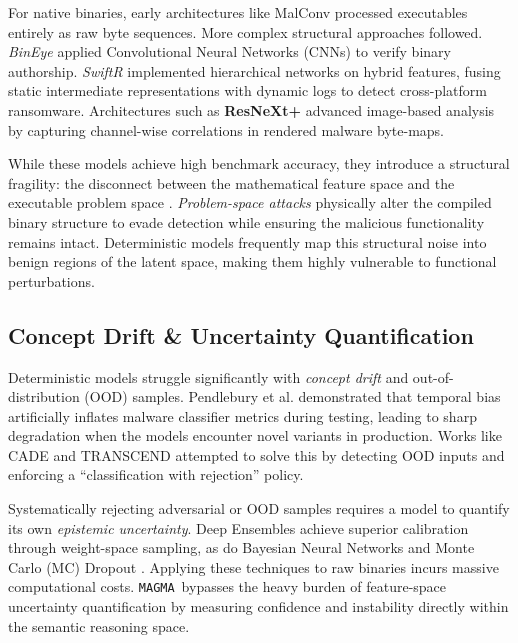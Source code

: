 \documentclass[pdflatex,sn-mathphys-num]{sn-jnl}
\newcommand{\sysname}{\texttt{MAGMA}~}
\begin{document}
For native binaries, early architectures like MalConv \cite{RaffEdward2018Malware} processed executables entirely as raw byte sequences. More complex structural approaches followed. \textit{BinEye} \cite{alrabaee2019BinEye} applied Convolutional Neural Networks (CNNs) to verify binary authorship. \textit{SwiftR} \cite{karbab2023SwiftR} implemented hierarchical networks on hybrid features, fusing static intermediate representations with dynamic logs to detect cross-platform ransomware. Architectures such as \textbf{ResNeXt+} \cite{HeYuewang2024ResNeXt} advanced image-based analysis by capturing channel-wise correlations in rendered malware byte-maps.

While these models achieve high benchmark accuracy, they introduce a structural fragility: the disconnect between the mathematical feature space and the executable problem space \cite{PierazziFabio2020Intriguing}. \textit{Problem-space attacks} \cite{Demetrio2021Functionality, Mukherjee2023Evading} physically alter the compiled binary structure to evade detection while ensuring the malicious functionality remains intact. Deterministic models frequently map this structural noise into benign regions of the latent space, making them highly vulnerable to functional perturbations.

\subsection{Concept Drift \& Uncertainty Quantification}
Deterministic models struggle significantly with \textit{concept drift} and out-of-distribution (OOD) samples. Pendlebury et al. \cite{Pendlebury2019Tesseract} demonstrated that temporal bias artificially inflates malware classifier metrics during testing, leading to sharp degradation when the models encounter novel variants in production. Works like CADE \cite{Yang2021CADE} and TRANSCEND \cite{Barbero2022Transcending} attempted to solve this by detecting OOD inputs and enforcing a ``classification with rejection'' policy.

Systematically rejecting adversarial or OOD samples requires a model to quantify its own \textit{epistemic uncertainty}. Deep Ensembles \cite{Lakshminarayanan2017Simple} achieve superior calibration through weight-space sampling, as do Bayesian Neural Networks and Monte Carlo (MC) Dropout \cite{Gal2016Dropout}. Applying these techniques to raw binaries incurs massive computational costs. \sysname bypasses the heavy burden of feature-space uncertainty quantification by measuring confidence and instability directly within the semantic reasoning space.
\end{document}
